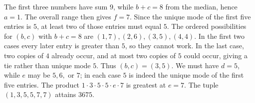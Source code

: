 The first three numbers have sum $9$, while $b+c=8$ from the median, hence $a=1$. The overall range then gives $f=7$. Since the unique mode of the first five entries is $5$, at least two of those entries must equal $5$. The ordered possibilities for $(b,c)$ with $b+c=8$ are $(1,7),(2,6),(3,5),(4,4)$. In the first two cases every later entry is greater than $5$, so they cannot work. In the last case, two copies of $4$ already occur, and at most two copies of $5$ could occur, giving a tie rather than unique mode $5$. Thus $(b,c)=(3,5)$. We must have $d=5$, while $e$ may be $5,6,$ or $7$; in each case $5$ is indeed the unique mode of the first five entries. The product $1\cdot3\cdot5\cdot5\cdot e\cdot7$ is greatest at $e=7$. The tuple $(1,3,5,5,7,7)$ attains $\boxed{3675}$.
